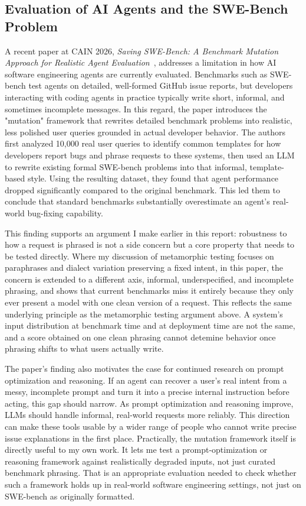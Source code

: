 \documentclass[11pt]{article}
\begin{document}
\subsection{Evaluation of AI Agents and the SWE-Bench Problem}

A recent paper at CAIN 2026, \textit{Saving SWE-Bench: A Benchmark Mutation Approach for Realistic Agent Evaluation}~\citep{garg2025saving}, addresses a limitation in how AI software engineering agents are currently evaluated. Benchmarks such as SWE-bench test agents on detailed, well-formed GitHub issue reports, but developers interacting with coding agents in practice typically write short, informal, and sometimes incomplete messages. In this regard, the paper introduces the "mutation" framework that rewrites detailed benchmark problems into realistic, less polished user queries grounded in actual developer behavior. The authors first analyzed 10,000 real user queries to identify common templates for how developers report bugs and phrase requests to these systems, then used an LLM to rewrite existing formal SWE-bench problems into that informal, template-based style. Using the resulting dataset, they found that agent performance dropped significantly compared to the original benchmark.  This led them to conclude that standard benchmarks substantially overestimate an agent's real-world bug-fixing capability.

This finding supports an argument I make earlier in this report: robustness to how a request is phrased is not a side concern but a core property that needs to be tested directly. Where my discussion of metamorphic testing focuses on paraphrases and dialect variation preserving a fixed intent, in this paper, the concern is extended to a different axis, informal, underspecified, and incomplete phrasing, and shows that current benchmarks miss it entirely because they only ever present a model with one clean version of a request. This reflects the same underlying principle as the metamorphic testing argument above. A system's input distribution at benchmark time and at deployment time are not the same, and a score obtained on one clean phrasing cannot detemine behavior once phrasing shifts to what users actually write.

The paper's finding also motivates the case for continued research on prompt optimization and reasoning. If an agent can recover a user's real intent from a messy, incomplete prompt and turn it into a precise internal instruction before acting, this gap should narrow. As prompt optimization and reasoning improve, LLMs should handle informal, real-world requests more reliably. This direction can make these tools usable by a wider range of people who cannot write precise issue explanations in the first place. Practically, the mutation framework itself is directly useful to my own work. It lets me test a prompt-optimization or reasoning framework against realistically degraded inputs, not just curated benchmark phrasing. That is an appropriate evaluation needed to check whether such a framework holds up in real-world software engineering settings, not just on SWE-bench as originally formatted.
\end{document}
